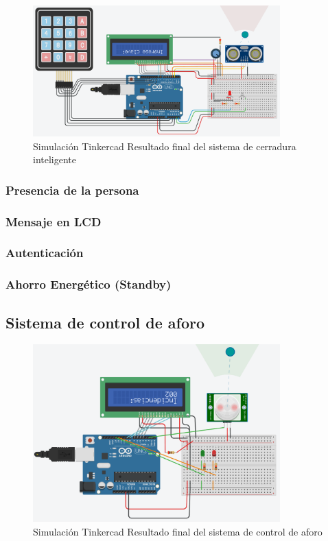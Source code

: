 \documentclass{article}
\begin{document}
\begin{figure}[H]
    \centering
    \includegraphics[width=0.85\textwidth]{./img/ckpt_6.png}
    \caption{Simulación Tinkercad Resultado final del sistema de cerradura inteligente}
    \label{fig:cerradura_smart}
\end{figure}

\subsubsection{Presencia de la persona}

\subsubsection{Mensaje en LCD}

\subsubsection{Autenticación}

\subsubsection{Ahorro Energético (Standby)}

\subsection{Sistema de control de aforo}

\begin{figure}[H]
    \centering
    \includegraphics[width=0.85\textwidth]{./img/ckpt_9.png}
    \caption{Simulación Tinkercad Resultado final del sistema de control de aforo}
    \label{fig:control_aforo}
\end{figure}
\end{document}
